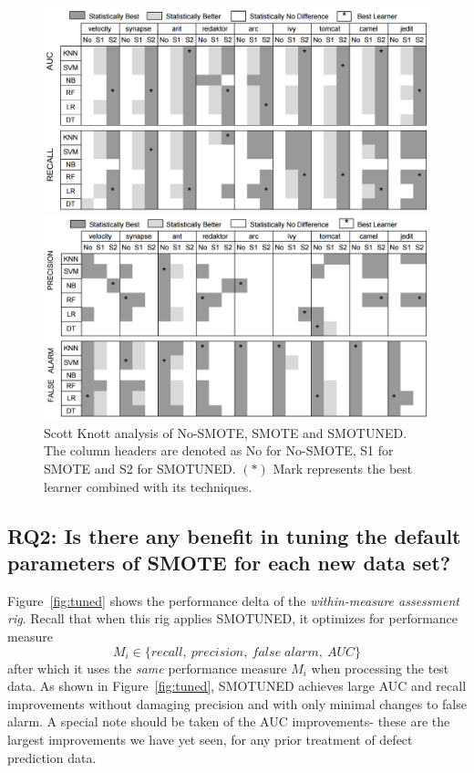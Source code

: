 \documentclass[10pt,conference]{IEEEtran}
\theoremstyle{break}
\theoremstyle{break}
\newcommand{\smb}{{\sc SMOTUNED}}
\begin{document}
\begin{figure}[!t]
\begin{minipage}{.5\linewidth}
\centering
        \includegraphics[width=1\linewidth]{./fig/AUC_recall.png}
            \end{minipage}%
\begin{minipage}{.5\linewidth}
        \centering
        \includegraphics[width=1\linewidth]{./fig/prec_pf.png}
    \end{minipage}%
    \caption{Scott Knott analysis of No-SMOTE, SMOTE and SMOTUNED. The column headers are denoted as No for No-SMOTE, S1 for SMOTE and S2 for SMOTUNED. $(\ast)$ Mark represents the best learner combined with its techniques.}
    \label{fig:stats}
\vspace{-0.5cm}
\end{figure}


\subsection {{\bf RQ2}: Is there any benefit in tuning the default parameters of SMOTE for each new data set?}

Figure~\ref{fig:tuned} shows the performance delta of the {\em within-measure assessment rig}.
Recall that when this rig applies {\smb}, it optimizes for performance measure
\[M_i \in \{ 
\mathit{recall},
\ \mathit{precision}, 
\ \mathit{false\; alarm},
\ \mathit{AUC}
\}
\]
after which it uses the {\em same} performance measure
$M_i$ when processing the test data.
As shown in Figure~\ref{fig:tuned}, 
{\smb} achieves large AUC and recall improvements
without
 damaging precision and  with only minimal changes
 to false alarm. A special note should be taken of the AUC improvements- these are the largest improvements
 we have yet seen, for any prior treatment of defect prediction data.
\end{document}
